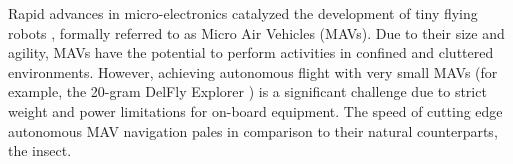 Rapid advances in micro-electronics catalyzed the development of tiny flying robots \cite{Floreano2015}, formally referred to as Micro Air Vehicles (MAVs). Due to their size and agility, MAVs have the potential to perform activities in confined and cluttered environments. However, achieving autonomous flight with very small MAVs (for example, the 20-gram DelFly Explorer \cite{DeWagter2014}) is a significant challenge due to strict weight and power limitations for on-board equipment. The speed of cutting edge autonomous MAV navigation pales in comparison to their natural counterparts, the insect.



